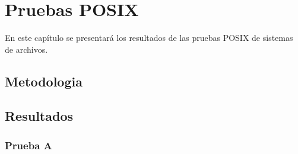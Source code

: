 \chapter{Pruebas POSIX}
\label{posix}

En este capítulo se presentará los resultados de las pruebas POSIX de sistemas de archivos.


\section{Metodologia}
\label{metodologia}


\section{Resultados}
\label{resultados}


\subsection{Prueba A}
\label{prueba_a}



